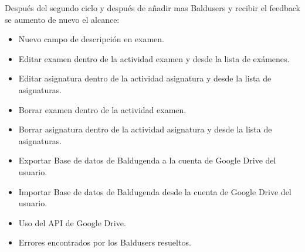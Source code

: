 Después del segundo ciclo y después de añadir mas Baldusers y recibir el feedback se aumento de nuevo el alcance:
\begin{itemize}
	\item Nuevo campo de descripción en examen.
	\item Editar examen dentro de la actividad examen y desde la lista de exámenes.
	\item Editar asignatura dentro de la actividad asignatura y desde la lista de asignaturas.
	\item Borrar examen dentro de la actividad examen.
	\item Borrar asignatura dentro de la actividad asignatura y desde la lista de asignaturas.
	\item Exportar Base de datos de Baldugenda a la cuenta de Google Drive del usuario.
	\item Importar Base de datos de Baldugenda desde la cuenta de Google Drive del usuario.
	\item Uso del API de Google Drive.
	\item Errores encontrados por los Baldusers resueltos.
\end{itemize}

